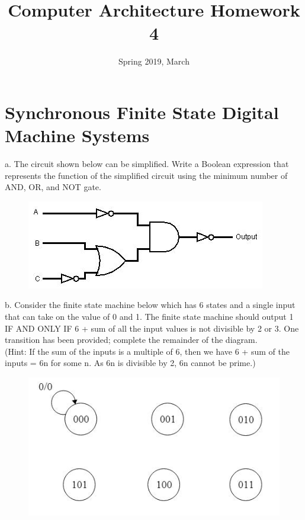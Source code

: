\documentclass{article}
\title{Computer Architecture Homework 4}
\date{Spring 2019, March}
\begin{document}
\maketitle

\section{Synchronous Finite State Digital Machine Systems}
a. The circuit shown below can be simplified. Write a Boolean expression that represents the function of the simplified circuit using the minimum number of AND, OR, and NOT gate.
\begin{figure}[htbp]
	\centering
	\includegraphics[width=0.7\linewidth]{hw4_1.jpg}
	\label{fig:1}
\end{figure}
\newpage

\noindent b. Consider the finite state machine below which has 6 states and a single input that can take on the value of 0 and 1. The finite state machine should output 1 IF AND ONLY IF 6 + sum of all the input values is not divisible by 2 or 3. One transition has been provided; complete the remainder of the diagram. \\
\noindent (Hint: If the sum of the inputs is a multiple of 6, then we have 6 + sum of the inputs = 6n for some n. As 6n is divisible by 2, 6n cannot be prime.)
\begin{figure}[htbp]
	\centering
	\includegraphics[width=0.7\linewidth]{hw4_2.jpg}
	\label{fig:1}
\end{figure}
\end{document}
